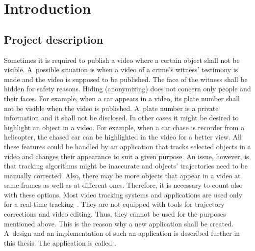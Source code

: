 

\chapter{Introduction}
\section{Project description}
Sometimes it is required to publish a video where a certain object shall not be visible. A~possible situation is when a video of a crime’s witness’ testimony is made and the video is supposed to be published. The face of the witness shall be hidden for safety reasons. Hiding (anonymizing) does not concern only people and their faces. For example, when a car appears in a video, its plate number shall not be visible when the video is published. A~plate number is a private information and it shall not be disclosed. In other cases it might be desired to highlight an object in a video. For example, when a car chase is recorder from a helicopter, the chased car can be highlighted in the video for a better view. All these features could be handled by an application that tracks selected objects in a video and changes their appearance to suit a given purpose. An issue, however, is that tracking algorithms might be inaccurate and objects' trajectories need to be manually corrected. Also, there may be more objects that appear in a video at same frames as well as at different ones. Therefore, it is necessary to count also with these options. Most video tracking systems and applications are used only for a real-time tracking~\cite{real_time_tracking}. They are not equipped with tools for trajectory corrections and video editing. Thus, they cannot be used for the purposes mentioned above. This is the reason why a new application shall be created. A~design and an implementation of such an application is described further in this thesis. The application is called .

